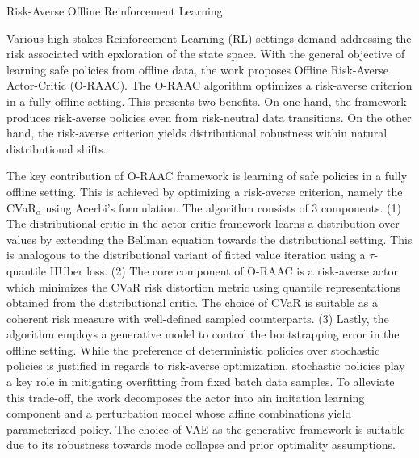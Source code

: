 \documentclass[11pt,letterpaper]{article}
\begin{document}
\begin{center}
  \large{Risk-Averse Offline Reinforcement Learning}
\end{center}

Various high-stakes Reinforcement Learning (RL) settings demand addressing the risk associated with epxloration of the state space. With the general objective of learning safe policies from offline data, the work proposes Offline Risk-Averse Actor-Critic (O-RAAC). The O-RAAC algorithm optimizes a risk-averse criterion in a fully offline setting. This presents two benefits. On one hand, the framework produces risk-averse policies even from risk-neutral data transitions. On the other hand, the risk-averse criterion yields distributional robustness within natural distributional shifts.

The key contribution of O-RAAC framework is learning of safe policies in a fully offline setting. This is achieved by optimizing a risk-averse criterion, namely the CVaR$_{\alpha}$ using Acerbi's formulation. The algorithm consists of 3 components. (1) The distributional critic in the actor-critic framework learns a distribution over values by extending the Bellman equation towards the distributional setting. This is analogous to the distributional variant of fitted value iteration using a $\tau$-quantile HUber loss. (2) The core component of O-RAAC is a risk-averse actor which minimizes the CVaR risk distortion metric using quantile representations obtained from the distributional critic. The choice of CVaR is suitable as a coherent risk measure with well-defined sampled counterparts. (3) Lastly, the algorithm employs a generative model to control the bootstrapping error in the offline setting. While the preference of deterministic policies over stochastic policies is justified in regards to risk-averse optimization, stochastic policies play a key role in mitigating overfitting from fixed batch data samples. To alleviate this trade-off, the work decomposes the actor into ain imitation learning component and a perturbation model whose affine combinations yield parameterized policy. The choice of VAE as the generative framework is suitable due to its robustness towards mode collapse and prior optimality assumptions.
\end{document}
